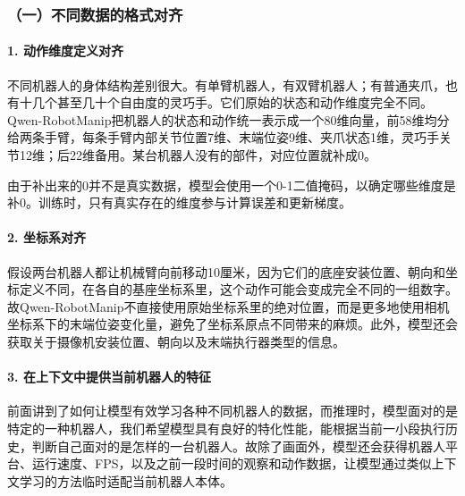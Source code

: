 \hypertarget{ux4e00ux4e0dux540cux6570ux636eux7684ux683cux5f0fux5bf9ux9f50}{%
\subsubsection{（一）不同数据的格式对齐}\label{ux4e00ux4e0dux540cux6570ux636eux7684ux683cux5f0fux5bf9ux9f50}}

\hypertarget{ux52a8ux4f5cux7ef4ux5ea6ux5b9aux4e49ux5bf9ux9f50}{%
\paragraph{1. 动作维度定义对齐}\label{ux52a8ux4f5cux7ef4ux5ea6ux5b9aux4e49ux5bf9ux9f50}}

不同机器人的身体结构差别很大。有单臂机器人，有双臂机器人；有普通夹爪，也有十几个甚至几十个自由度的灵巧手。它们原始的状态和动作维度完全不同。Qwen-RobotManip把机器人的状态和动作统一表示成一个80维向量，前58维均分给两条手臂，每条手臂内部关节位置7维、末端位姿9维、夹爪状态1维，灵巧手关节12维；后22维备用。某台机器人没有的部件，对应位置就补成0。

由于补出来的0并不是真实数据，模型会使用一个0-1二值掩码，以确定哪些维度是补0。训练时，只有真实存在的维度参与计算误差和更新梯度。

\hypertarget{ux5750ux6807ux7cfbux5bf9ux9f50}{%
\paragraph{2. 坐标系对齐}\label{ux5750ux6807ux7cfbux5bf9ux9f50}}

假设两台机器人都让机械臂向前移动10厘米，因为它们的底座安装位置、朝向和坐标定义不同，在各自的基座坐标系里，这个动作可能会变成完全不同的一组数字。故Qwen-RobotManip不直接使用原始坐标系里的绝对位置，而是更多地使用相机坐标系下的末端位姿变化量，避免了坐标系原点不同带来的麻烦。此外，模型还会获取关于摄像机安装位置、朝向以及末端执行器类型的信息。

\hypertarget{ux5728ux4e0aux4e0bux6587ux4e2dux63d0ux4f9bux5f53ux524dux673aux5668ux4ebaux7684ux7279ux5f81}{%
\paragraph{3. 在上下文中提供当前机器人的特征}\label{ux5728ux4e0aux4e0bux6587ux4e2dux63d0ux4f9bux5f53ux524dux673aux5668ux4ebaux7684ux7279ux5f81}}

前面讲到了如何让模型有效学习各种不同机器人的数据，而推理时，模型面对的是特定的一种机器人，我们希望模型具有良好的特化性能，能根据当前一小段执行历史，判断自己面对的是怎样的一台机器人。故除了画面外，模型还会获得机器人平台、运行速度、FPS，以及之前一段时间的观察和动作数据，让模型通过类似上下文学习的方法临时适配当前机器人本体。

